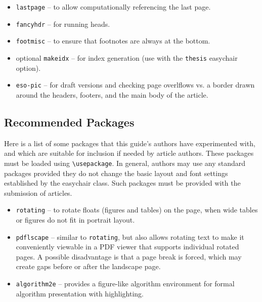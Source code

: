 \documentclass{easychair}
\newcommand{\easychair}{\textsf{easychair}}
\begin{document}
\begin{itemize}
\item
\texttt{lastpage} \cite{lastpage-package} -- to allow computationally
referencing the last page.

\item
\texttt{fancyhdr} \cite{fancyhdr-package} -- for running heads.

\item
\texttt{footmisc} \cite{footmisc-package} -- to ensure that footnotes are
always at the bottom.

\item
optional \texttt{makeidx} \cite{makeidx-package} -- for index generation
(use with the \texttt{thesis} {\easychair} option).

\item
\texttt{eso-pic} \cite{eso-pic-package} -- for draft versions and checking page
overlflows vs. a border drawn around the headers, footers, and the main body of
the article.

\end{itemize}

\subsection{Recommended Packages}
\label{sect:recommended-packages}

Here is a list of some packages that this guide's authors have experimented 
with, and which are suitable for inclusion if needed by article authors.
These packages must be loaded using \verb+\usepackage+.
In general, authors may use any standard packages provided they do not change
the basic layout and font settings established by the {\easychair} class.
Such packages must be provided with the submission of articles.

\begin{itemize}
\item
\texttt{rotating} \cite{rotating-package} -- to rotate floats (figures and
tables) on the page, when wide tables or figures do not fit in portrait layout.

\item
\texttt{pdflscape} \cite{pdflscape-package} -- similar to \texttt{rotating}, 
but also allows rotating text to make it conveniently viewable in a PDF 
viewer that supports individual rotated pages.
A possible disadvantage is that a page break is forced, which may create
gaps before or after the landscape page.

\item
\texttt{algorithm2e} \cite{algorithm2e-package} -- provides a figure-like
algorithm environment for formal algorithm presentation with highlighting.

\end{itemize}
\end{document}
